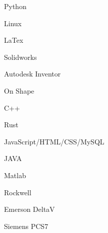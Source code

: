 \begin{cSubsection}{}
    \begin{experienceItem} {}{Python}{}{} \end{experienceItem}
    \begin{experienceItem} {\hphantom{}}{Linux}{}{} \end{experienceItem}
    \begin{experienceItem} {\hphantom{}}{LaTex}{}{} \end{experienceItem}
    \begin{experienceItem} {\hphantom{}}{Solidworks}{}{} \end{experienceItem}
    \begin{experienceItem} {\hphantom{}}{Autodesk Inventor}{}{} \end{experienceItem}
    \begin{experienceItem} {\hphantom{}}{On Shape}{}{} \end{experienceItem}

    \begin{experienceItem} {}{C++}{}{} \end{experienceItem}
    \begin{experienceItem} {\hphantom{}}{Rust}{}{} \end{experienceItem}
    \begin{experienceItem} {\hphantom{}}{JavaScript/HTML/CSS/MySQL}{}{} \end{experienceItem}
    \begin{experienceItem} {\hphantom{}}{JAVA}{}{} \end{experienceItem}
    \begin{experienceItem} {\hphantom{}}{Matlab}{}{} \end{experienceItem}
    \begin{experienceItem} {\hphantom{}}{Rockwell}{}{} \end{experienceItem}
    \begin{experienceItem} {\hphantom{}}{Emerson DeltaV}{}{} \end{experienceItem}
    \begin{experienceItem} {\hphantom{}}{Siemens PCS7}{}{} \end{experienceItem}
\end{cSubsection}
